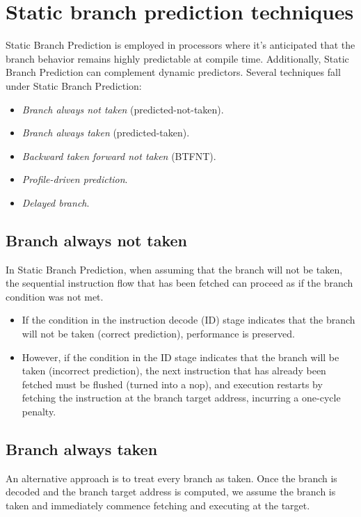 \section{Static branch prediction techniques}

Static Branch Prediction is employed in processors where it's anticipated that the branch behavior remains highly predictable at compile time. 
Additionally, Static Branch Prediction can complement dynamic predictors. 
Several techniques fall under Static Branch Prediction:
\begin{itemize}
    \item \textit{Branch always not taken} (predicted-not-taken). 
    \item \textit{Branch always taken} (predicted-taken). 
    \item \textit{Backward taken forward not taken} (BTFNT). 
    \item \textit{Profile-driven prediction}. 
    \item \textit{Delayed branch}. 
\end{itemize}

\subsection{Branch always not taken}
In Static Branch Prediction, when assuming that the branch will not be taken, the sequential instruction flow that has been fetched can proceed as if the branch condition was not met.
\begin{itemize}
    \item If the condition in the instruction decode (ID) stage indicates that the branch will not be taken (correct prediction), performance is preserved.
    \item However, if the condition in the ID stage indicates that the branch will be taken (incorrect prediction), the next instruction that has already been fetched must be flushed (turned into a nop), and execution restarts by fetching the instruction at the branch target address, incurring a one-cycle penalty.
\end{itemize}

\subsection{Branch always taken}
An alternative approach is to treat every branch as taken. 
Once the branch is decoded and the branch target address is computed, we assume the branch is taken and immediately commence fetching and executing at the target.

